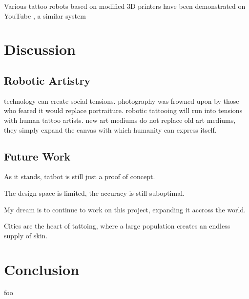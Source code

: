 \documentclass[11pt]{article}
\begin{document}
Various tattoo robots based on modified 3D printers have been demonstrated on YouTube \cite{EmilyTheEngineer2025}, a similar system \cite{YamanDeif2021}

\section{Discussion}

\subsection{Robotic Artistry}

technology can create social tensions.
photography was frowned upon by those who feared it would replace portraiture.
robotic tattooing will run into tensions with human tattoo artists.
new art mediums do not replace old art mediums, they simply expand the canvas with which humanity can express itself.

\subsection{Future Work}

As it stands, tatbot is still just a proof of concept.

The design space is limited, the accuracy is still suboptimal.

My dream is to continue to work on this project, expanding it accross the world.

Cities are the heart of tattoing, where a large population creates an endless supply of skin.

\section{Conclusion}

foo



\end{document}
